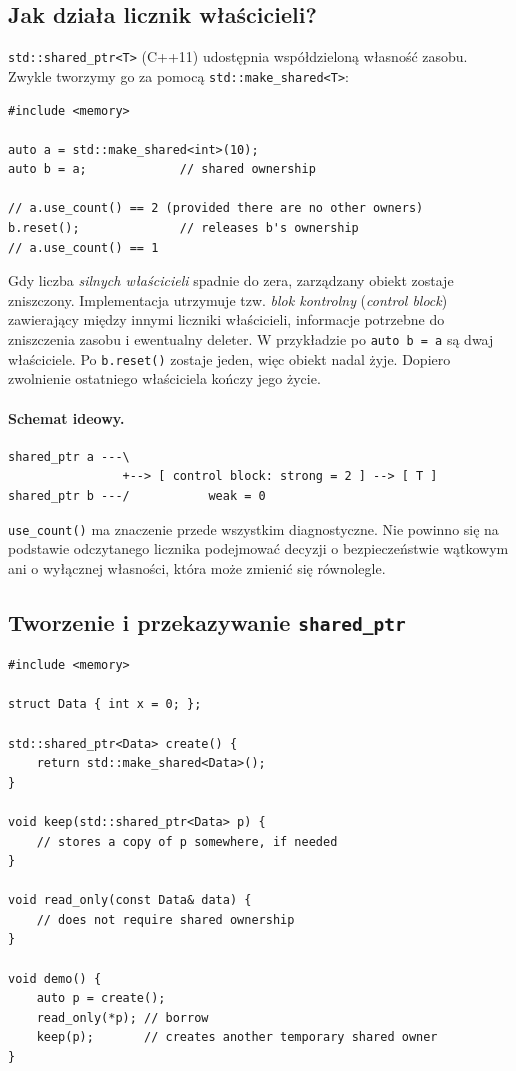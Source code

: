 \subsection{Jak działa licznik właścicieli?}

\texttt{std::shared\_ptr<T>} (C++11) udostępnia współdzieloną
własność zasobu. Zwykle tworzymy go za pomocą
\texttt{std::make\_shared<T>}:

\begin{lstlisting}
#include <memory>

auto a = std::make_shared<int>(10);
auto b = a;             // shared ownership

// a.use_count() == 2 (provided there are no other owners)
b.reset();              // releases b's ownership
// a.use_count() == 1
\end{lstlisting}

Gdy liczba \emph{silnych właścicieli} spadnie do zera, zarządzany
obiekt zostaje zniszczony. Implementacja utrzymuje tzw.
\emph{blok kontrolny} (\emph{control block}) zawierający między
innymi liczniki właścicieli, informacje potrzebne do zniszczenia
zasobu i ewentualny deleter.
W przykładzie po \texttt{auto b = a} są dwaj właściciele. Po
\texttt{b.reset()} zostaje jeden, więc obiekt nadal żyje. Dopiero
zwolnienie ostatniego właściciela kończy jego życie.

\paragraph{Schemat ideowy.}
\begin{lstlisting}
shared_ptr a ---\
                +--> [ control block: strong = 2 ] --> [ T ]
shared_ptr b ---/           weak = 0
\end{lstlisting}

\texttt{use\_count()} ma znaczenie przede wszystkim diagnostyczne.
Nie powinno się na podstawie odczytanego licznika podejmować decyzji
o bezpieczeństwie wątkowym ani o wyłącznej własności, która może
zmienić się równolegle.

\subsection{Tworzenie i przekazywanie \texttt{shared\_ptr}}

\begin{lstlisting}
#include <memory>

struct Data { int x = 0; };

std::shared_ptr<Data> create() {
    return std::make_shared<Data>();
}

void keep(std::shared_ptr<Data> p) {
    // stores a copy of p somewhere, if needed
}

void read_only(const Data& data) {
    // does not require shared ownership
}

void demo() {
    auto p = create();
    read_only(*p); // borrow
    keep(p);       // creates another temporary shared owner
}
\end{lstlisting}

